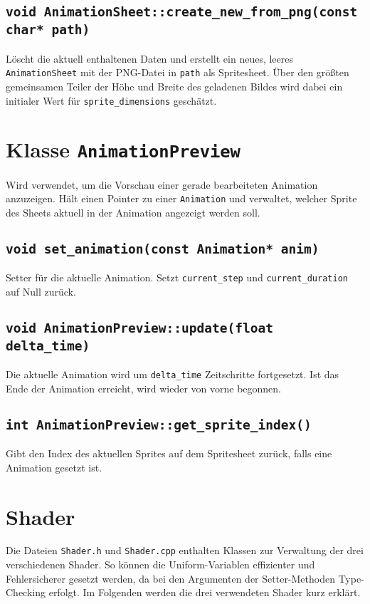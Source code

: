 \section{\lstinline{void AnimationSheet::create_new_from_png(const char* path)}}
Löscht die aktuell enthaltenen Daten und erstellt ein neues, leeres \lstinline{AnimationSheet} mit der PNG-Datei in \lstinline{path} als Spritesheet. Über den größten gemeinsamen Teiler der Höhe und Breite des geladenen Bildes wird dabei ein initialer Wert für \lstinline{sprite_dimensions} geschätzt.



\chapter{Klasse \lstinline{AnimationPreview}}
Wird verwendet, um die Vorschau einer gerade bearbeiteten Animation anzuzeigen. Hält einen Pointer zu einer \lstinline{Animation} und verwaltet, welcher Sprite des Sheets aktuell in der Animation angezeigt werden soll. 

\section{\lstinline{void set_animation(const Animation* anim)}}
Setter für die aktuelle Animation. Setzt \lstinline{current_step} und \lstinline{current_duration} auf Null zurück.

\section{\lstinline{void AnimationPreview::update(float delta_time)}}
Die aktuelle Animation wird um \lstinline{delta_time} Zeitschritte fortgesetzt. Ist das Ende der Animation erreicht, wird wieder von vorne begonnen. 

\section{\lstinline{int AnimationPreview::get_sprite_index()}}
Gibt den Index des aktuellen Sprites auf dem Spritesheet zurück, falls eine Animation gesetzt ist.

\chapter{Shader}
Die Dateien \lstinline{Shader.h} und \lstinline{Shader.cpp} enthalten Klassen zur Verwaltung der drei verschiedenen Shader. So können die Uniform-Variablen effizienter und Fehlersicherer gesetzt werden, da bei den Argumenten der Setter-Methoden Type-Checking erfolgt. Im Folgenden werden die drei verwendeten Shader kurz erklärt.

